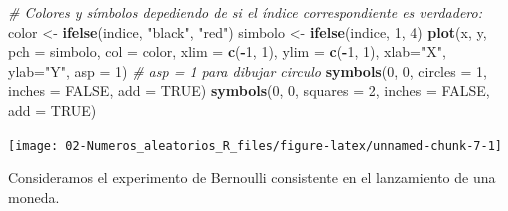 \documentclass[]{book}
\newenvironment{Shaded}{\begin{snugshade}}{\end{snugshade}}
\newcommand{\KeywordTok}[1]{\textcolor[rgb]{0.13,0.29,0.53}{\textbf{#1}}}
\newcommand{\DataTypeTok}[1]{\textcolor[rgb]{0.13,0.29,0.53}{#1}}
\newcommand{\DecValTok}[1]{\textcolor[rgb]{0.00,0.00,0.81}{#1}}
\newcommand{\StringTok}[1]{\textcolor[rgb]{0.31,0.60,0.02}{#1}}
\newcommand{\CommentTok}[1]{\textcolor[rgb]{0.56,0.35,0.01}{\textit{#1}}}
\newcommand{\OtherTok}[1]{\textcolor[rgb]{0.56,0.35,0.01}{#1}}
\newcommand{\OperatorTok}[1]{\textcolor[rgb]{0.81,0.36,0.00}{\textbf{#1}}}
\newcommand{\NormalTok}[1]{#1}
\theoremstyle{definition}
\theoremstyle{definition}
\theoremstyle{definition}
\theoremstyle{remark}
\let\BeginKnitrBlock\begin \let\EndKnitrBlock\end
\begin{document}
\begin{enumerate}
\begin{Shaded}
\begin{Highlighting}[]
\CommentTok{# Colores y símbolos depediendo de si el índice correspondiente es verdadero:}
\NormalTok{color <-}\StringTok{ }\KeywordTok{ifelse}\NormalTok{(indice, }\StringTok{"black"}\NormalTok{, }\StringTok{"red"}\NormalTok{) }
\NormalTok{simbolo <-}\StringTok{ }\KeywordTok{ifelse}\NormalTok{(indice, }\DecValTok{1}\NormalTok{, }\DecValTok{4}\NormalTok{)}
\KeywordTok{plot}\NormalTok{(x, y, }\DataTypeTok{pch =}\NormalTok{ simbolo, }\DataTypeTok{col =}\NormalTok{ color, }
     \DataTypeTok{xlim =} \KeywordTok{c}\NormalTok{(}\OperatorTok{-}\DecValTok{1}\NormalTok{, }\DecValTok{1}\NormalTok{), }\DataTypeTok{ylim =} \KeywordTok{c}\NormalTok{(}\OperatorTok{-}\DecValTok{1}\NormalTok{, }\DecValTok{1}\NormalTok{), }\DataTypeTok{xlab=}\StringTok{"X"}\NormalTok{, }\DataTypeTok{ylab=}\StringTok{"Y"}\NormalTok{, }\DataTypeTok{asp =} \DecValTok{1}\NormalTok{) }
     \CommentTok{# asp = 1 para dibujar circulo}
\KeywordTok{symbols}\NormalTok{(}\DecValTok{0}\NormalTok{, }\DecValTok{0}\NormalTok{, }\DataTypeTok{circles =} \DecValTok{1}\NormalTok{, }\DataTypeTok{inches =} \OtherTok{FALSE}\NormalTok{, }\DataTypeTok{add =} \OtherTok{TRUE}\NormalTok{)}
\KeywordTok{symbols}\NormalTok{(}\DecValTok{0}\NormalTok{, }\DecValTok{0}\NormalTok{, }\DataTypeTok{squares =} \DecValTok{2}\NormalTok{, }\DataTypeTok{inches =} \OtherTok{FALSE}\NormalTok{, }\DataTypeTok{add =} \OtherTok{TRUE}\NormalTok{)}
\end{Highlighting}
\end{Shaded}

  \begin{center}\texttt{[image: 02-Numeros\_aleatorios\_R\_files/figure-latex/unnamed-chunk-7-1]} \end{center}
\end{enumerate}

\BeginKnitrBlock{exercise}
\protect\hypertarget{exr:unnamed-chunk-8}{}{\label{exr:unnamed-chunk-8} }
\EndKnitrBlock{exercise} Consideramos el experimento de Bernoulli
consistente en el lanzamiento de una moneda.
\end{document}
